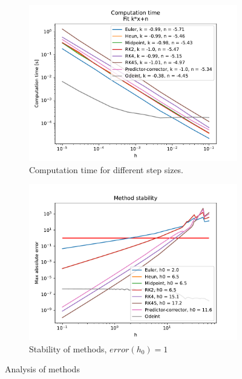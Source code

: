 \documentclass[12pt, a4paper]{article}
\begin{document}
\begin{figure}[hbtp]
\begin{subfigure}{0.5\textwidth}
  \includegraphics[width=\linewidth]{graphs/time.pdf}
  \caption{Computation time for different step sizes.} \label{fig:c}
  \end{subfigure}
  \hspace*{\fill}
  \begin{subfigure}{0.5\textwidth}
  \includegraphics[width=\linewidth]{graphs/stability.pdf}
  \caption{Stability of methods, $error(h_0)=1$} \label{fig:d}
  \end{subfigure} 
  \caption{Analysis of methods} \label{fig:1}
\end{figure}
\end{document}
